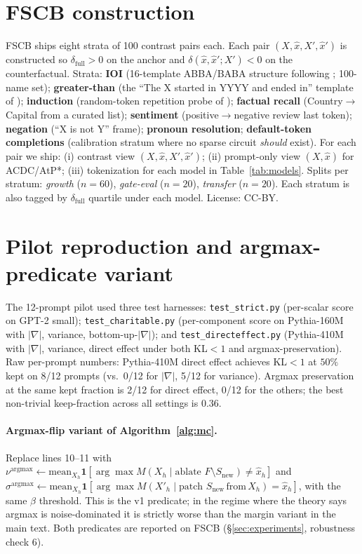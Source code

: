 \documentclass[10pt]{article}
\begin{document}
\section{FSCB construction}
\label{app:fscb}

FSCB ships eight strata of 100 contrast pairs each. Each pair $(X, \hat x, X', \hat x')$ is constructed so $\delta_{\text{full}} > 0$ on the anchor and $\delta(\hat x, \hat x'; X') < 0$ on the counterfactual. Strata: \textbf{IOI} (16-template ABBA/BABA structure following \citealp{wang2022interpretability}; 100-name set); \textbf{greater-than} (the ``The X started in YYYY and ended in'' template of \citealp{hanna2023greater}); \textbf{induction} (random-token repetition probe of \citealp{olsson2022induction}); \textbf{factual recall} (Country$\to$Capital from a curated list); \textbf{sentiment} (positive$\to$negative review last token); \textbf{negation} (``X is not Y'' frame); \textbf{pronoun resolution}; \textbf{default-token completions} (calibration stratum where no sparse circuit \emph{should} exist). For each pair we ship: (i) contrast view $(X, \hat x, X', \hat x')$; (ii) prompt-only view $(X, \hat x)$ for ACDC/AtP*; (iii) tokenization for each model in Table~\ref{tab:models}. Splits per stratum: \emph{growth} ($n=60$), \emph{gate-eval} ($n=20$), \emph{transfer} ($n=20$). Each stratum is also tagged by $\delta_{\text{full}}$ quartile under each model. License: CC-BY.

\section{Pilot reproduction and argmax-predicate variant}
\label{app:argmax}

{\sloppy
The 12-prompt pilot used three test harnesses: \texttt{test\_strict.py} (per-scalar score on GPT-2 small); \texttt{test\_charitable.py} (per-component score on Pythia-160M with $|\nabla|$, variance, bottom-up-$|\nabla|$); and \texttt{test\_directeffect.py} (Pythia-410M with $|\nabla|$, variance, direct effect under both KL$<1$ and argmax-preservation). Raw per-prompt numbers: Pythia-410M direct effect achieves KL$<1$ at $50\%$ kept on 8/12 prompts (vs.\ 0/12 for $|\nabla|$, 5/12 for variance). Argmax preservation at the same kept fraction is 2/12 for direct effect, 0/12 for the others; the best non-trivial keep-fraction across all settings is $0.36$.\par}

\paragraph{Argmax-flip variant of Algorithm~\ref{alg:mc}.} Replace lines 10--11 with $\nu^{\text{argmax}} \gets \mathrm{mean}_{X_h} \mathbf{1}[\arg\max M(X_h \mid \text{ablate } F\setminus S_{\text{new}}) \neq \hat x_h]$ and $\sigma^{\text{argmax}} \gets \mathrm{mean}_{X_h} \mathbf{1}[\arg\max M(X'_h \mid \text{patch } S_{\text{new}}\,\text{from}\,X_h) = \hat x_h]$, with the same $\beta$ threshold. This is the v1 predicate; in the regime where the theory says argmax is noise-dominated it is strictly worse than the margin variant in the main text. Both predicates are reported on FSCB (\S\ref{sec:experiments}, robustness check 6).
\end{document}
